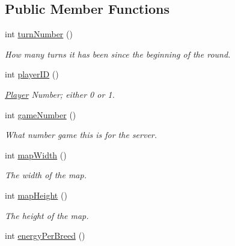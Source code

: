 \subsection*{\-Public \-Member \-Functions}
\begin{DoxyCompactItemize}
\item 
\hypertarget{classBaseAI_a19ade7391bfe101884a35f48fb840199}{int \hyperlink{classBaseAI_a19ade7391bfe101884a35f48fb840199}{turn\-Number} ()}\label{classBaseAI_a19ade7391bfe101884a35f48fb840199}

\begin{DoxyCompactList}\small\item\em \-How many turns it has been since the beginning of the round. \end{DoxyCompactList}\item 
\hypertarget{classBaseAI_a16aab1036653c8f8fb5370cf2f6a3e10}{int \hyperlink{classBaseAI_a16aab1036653c8f8fb5370cf2f6a3e10}{player\-I\-D} ()}\label{classBaseAI_a16aab1036653c8f8fb5370cf2f6a3e10}

\begin{DoxyCompactList}\small\item\em \hyperlink{classPlayer}{\-Player} \-Number; either 0 or 1. \end{DoxyCompactList}\item 
\hypertarget{classBaseAI_a50d3091db33b93c6f7c2d11dd64b4c7a}{int \hyperlink{classBaseAI_a50d3091db33b93c6f7c2d11dd64b4c7a}{game\-Number} ()}\label{classBaseAI_a50d3091db33b93c6f7c2d11dd64b4c7a}

\begin{DoxyCompactList}\small\item\em \-What number game this is for the server. \end{DoxyCompactList}\item 
\hypertarget{classBaseAI_acef275d421ba8018d14071a1383b3769}{int \hyperlink{classBaseAI_acef275d421ba8018d14071a1383b3769}{map\-Width} ()}\label{classBaseAI_acef275d421ba8018d14071a1383b3769}

\begin{DoxyCompactList}\small\item\em \-The width of the map. \end{DoxyCompactList}\item 
\hypertarget{classBaseAI_aab7aa00684066902ce65247ea7d86ff5}{int \hyperlink{classBaseAI_aab7aa00684066902ce65247ea7d86ff5}{map\-Height} ()}\label{classBaseAI_aab7aa00684066902ce65247ea7d86ff5}

\begin{DoxyCompactList}\small\item\em \-The height of the map. \end{DoxyCompactList}\item 
\hypertarget{classBaseAI_a1ac6115acb624aae64ac49af8f78435a}{int \hyperlink{classBaseAI_a1ac6115acb624aae64ac49af8f78435a}{energy\-Per\-Breed} ()}\label{classBaseAI_a1ac6115acb624aae64ac49af8f78435a}


\end{DoxyCompactItemize}
